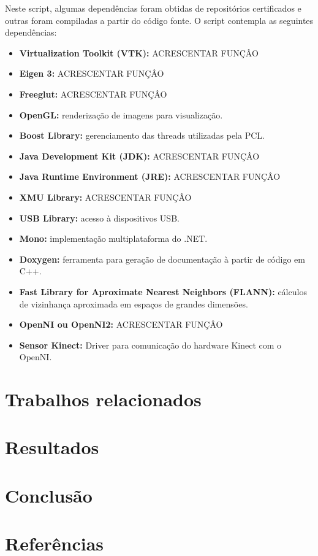 \documentclass[12pt]{article}
\begin{document}
Neste script, algumas dependências foram obtidas de repositórios certificados e outras foram compiladas a partir do código fonte. O script contempla as seguintes dependências:
\begin{itemize}
\item \textbf{Virtualization Toolkit (VTK):} ACRESCENTAR FUNÇÂO
\item \textbf{Eigen 3:} ACRESCENTAR FUNÇÂO
\item \textbf{Freeglut:} ACRESCENTAR FUNÇÂO
\item \textbf{OpenGL:} renderização de imagens para visualização.
\item \textbf{Boost Library:} gerenciamento das threads utilizadas pela PCL.
\item \textbf{Java Development Kit (JDK):} ACRESCENTAR FUNÇÂO
\item \textbf{Java Runtime Environment (JRE):} ACRESCENTAR FUNÇÂO
\item \textbf{XMU Library:} ACRESCENTAR FUNÇÂO
\item \textbf{USB Library:} acesso à dispositivos USB.
\item \textbf{Mono:} implementação multiplataforma do .NET.
\item \textbf{Doxygen:} ferramenta para geração de documentação à partir de código em C++.
\item \textbf{Fast Library for Aproximate Nearest Neighbors (FLANN):} cálculos de vizinhança aproximada em espaços de grandes dimensões.
\item \textbf{OpenNI ou OpenNI2:} ACRESCENTAR FUNÇÂO
\item \textbf{Sensor Kinect:} Driver para comunicação do hardware Kinect com o OpenNI.
\end{itemize}

\section{Trabalhos relacionados} \label{sec:trabalhosrelacionados}

\section{Resultados} \label{sec:resultados}

\section{Conclusão}

\section{Referências} 



\end{document}

